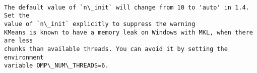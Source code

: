 \documentclass[11pt]{article}
\begin{document}
    \begin{center}
    \end{center}
    { \hspace*{\fill} \\}
    
    \begin{Verbatim}[commandchars=\\\{\}]
The default value of `n\_init` will change from 10 to 'auto' in 1.4. Set the
value of `n\_init` explicitly to suppress the warning
KMeans is known to have a memory leak on Windows with MKL, when there are less
chunks than available threads. You can avoid it by setting the environment
variable OMP\_NUM\_THREADS=6.
    \end{Verbatim}
\end{document}
